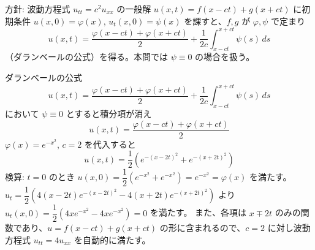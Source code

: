 
方針: 波動方程式 $u_{tt}=c^2u_{xx}$ の一般解 $u(x,t)=f(x-ct)+g(x+ct)$ に初期条件 $u(x,0)=\varphi(x)$, $u_t(x,0)=\psi(x)$ を課すと、$f,g$ が $\varphi,\psi$ で定まり
\[
u(x,t) = \frac{\varphi(x-ct) + \varphi(x+ct)}{2} + \frac{1}{2c}\int_{x-ct}^{x+ct} \psi(s)\,ds
\]
（ダランベールの公式）を得る。本問では $\psi \equiv 0$ の場合を扱う。

ダランベールの公式
\[
u(x,t) = \frac{\varphi(x-ct) + \varphi(x+ct)}{2} + \frac{1}{2c}\int_{x-ct}^{x+ct} \psi(s)\,ds
\]
において $\psi \equiv 0$ とすると積分項が消え
\[
\boxed{\; u(x,t) = \frac{\varphi(x-ct) + \varphi(x+ct)}{2} \;}
\]
$\varphi(x) = e^{-x^{2}}$, $c = 2$ を代入すると
\[
\boxed{\; u(x,t) = \frac{1}{2}\left(e^{-(x-2t)^{2}} + e^{-(x+2t)^{2}}\right) \;}
\]
検算: $t=0$ のとき $u(x,0) = \dfrac{1}{2}(e^{-x^2}+e^{-x^2}) = e^{-x^2} = \varphi(x)$ を満たす。
$u_t = \dfrac{1}{2}\left(4(x-2t)e^{-(x-2t)^2} - 4(x+2t)e^{-(x+2t)^2}\right)$ より $u_t(x,0) = \dfrac{1}{2}(4xe^{-x^2}-4xe^{-x^2}) = 0$ を満たす。
また、各項は $x\mp 2t$ のみの関数であり、$u=f(x-ct)+g(x+ct)$ の形に含まれるので、$c=2$ に対し波動方程式 $u_{tt}=4u_{xx}$ を自動的に満たす。

